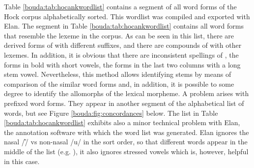 Table \ref{bouda:tab:hocankwordlist} contains a segment of all word forms of the Hoc{\A}k corpus alphabetically sorted. This wordlist was compiled and exported with Elan. The segment in Table \ref{bouda:tab:hocankwordlist} contains all word forms that resemble the lexeme  in the corpus. As can be seen in this list, there are derived forms of  with different suffixes, and there are compounds of  with other lexemes. In addition, it is obvious that there are inconsistent spellings of , the forms in bold with short vowels, the forms in the last two columns with a long stem vowel. Nevertheless, this method allows identifying stems by means of comparison of the similar word forms and, in addition, it is possible to some degree to identify the allomorphs of the lexical morpheme. A problem arises with prefixed word forms. They appear in another segment of the alphabetical list of words, but see Figure \ref{bouda:fig:concordances} below. The list in Table \ref{bouda:tab:hocankwordlist} exhibits also a minor technical problem with Elan, the annotation software with which the word list was generated. Elan ignores the nasal /\textit{{\U}}/ vs non-nasal /u/ in the sort order, so that different words appear in the middle of the list (e.g. ), it also ignores stressed vowels which is, however, helpful in this case.

